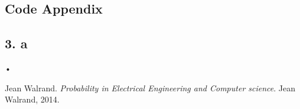 \documentclass[a4paper,11pt]{article}
\begin{document}
\begin{appendix}
\section*{Code Appendix}
\subsection*{3. a}\label{q3code}
  
  
  
  
\end{appendix}•
\begin{thebibliography}{9}


Jean Walrand. 
\textit{Probability in Electrical Engineering and Computer science}. 
Jean Walrand, 2014.

\end{thebibliography}
\end{document}
